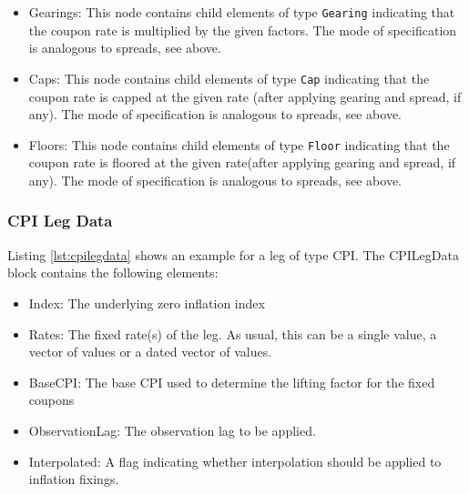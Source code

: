 \begin{itemize}
\item Gearings: This node contains child elements of type \lstinline!Gearing! indicating that the coupon rate is
  multiplied by the given factors. The mode of specification is analogous to spreads, see above.

\item Caps: This node contains child elements of type \lstinline!Cap! indicating that the coupon rate is capped at the
  given rate (after applying gearing and spread, if any). The mode of specification is analogous to spreads, see above.

\item Floors: This node contains child elements of type \lstinline!Floor! indicating that the coupon rate is floored at
  the given rate(after applying gearing and spread, if any). The mode of specification is analogous to spreads, see
  above.

\end{itemize}

\subsubsection{CPI Leg Data}
\label{ss:cpilegdata}

Listing \ref{lst:cpilegdata} shows an example for a leg of type CPI. The CPILegData block contains the following
elements:

\begin{itemize}
\item Index: The underlying zero inflation index
\item Rates: The fixed rate(s) of the leg. As usual, this can be a single value, a vector of values or a dated vector of
  values.
\item BaseCPI: The base CPI used to determine the lifting factor for the fixed coupons
\item ObservationLag: The observation lag to be applied.
\item Interpolated: A flag indicating whether interpolation should be applied to inflation fixings.
\end{itemize}

